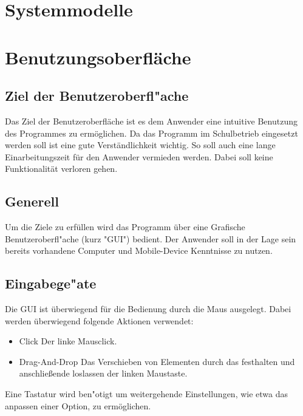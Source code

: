 \documentclass[parskip=full]{scrartcl}
\begin{document}
\section{Systemmodelle}

\section{Benutzungsoberfläche}

\subsection{Ziel der Benutzeroberfl"ache}

Das Ziel der Benutzeroberfläche ist es dem Anwender eine intuitive Benutzung des Programmes zu ermöglichen. Da das Programm im Schulbetrieb eingesetzt werden soll ist eine gute Verständlichkeit wichtig. So soll auch eine lange Einarbeitungszeit für den Anwender vermieden werden. Dabei soll keine Funktionalität verloren gehen.

\subsection{Generell}

Um die Ziele zu erfüllen wird das Programm über eine Grafische Benutzeroberfl"ache (kurz "GUI") bedient. Der Anwender soll in der Lage sein bereits vorhandene Computer und Mobile-Device Kenntnisse zu nutzen.

\subsection{Eingabege"ate}

Die GUI ist überwiegend für die Bedienung durch die Maus ausgelegt. Dabei werden überwiegend folgende Aktionen verwendet:

\begin{itemize} 
	\item Click \newline Der linke Mausclick.
	\item Drag-And-Drop \newline Das Verschieben von Elementen durch das festhalten und anschließende loslassen der linken Maustaste.
\end{itemize}

Eine Tastatur wird ben"otigt um weitergehende Einstellungen, wie etwa das anpassen einer Option, zu ermöglichen.
\end{document}
